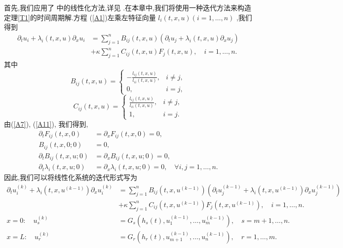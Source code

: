 \documentclass[notitlepage,cs4size,punct,oneside]{ctexrep}
\numberwithin{equation}{chapter}
\theoremstyle{mystyle}
\begin{document}
首先,我们应用了\cite{15} 中的线性化方法,详见\cite{12} .在本章中,我们将使用一种迭代方法来构造定理\ref{T1}的时间周期解.方程 (\ref{A1})左乘左特征向量 $l_{i}(t,x,u)(i=1, \ldots, n)$ ,我们得到
\begin{align}
    \partial_{t} u_{i}+\lambda_{i}(t,x,u) \partial_{x} u_{i} & = \sum_{j=1}^{n} B_{i j}(t,x,u)\left(\partial_{t} u_{j}+\lambda_{i}(t,x,u) \partial_{x} u_{j}\right)\nonumber \\
                                                             & +\kappa \sum_{j=1}^{n}C_{i j}(t,x,u) F_j(t,x,u), \quad i=1, \ldots, n .\label{B1}
\end{align}
其中
\begin{equation}\label{B2}
    B_{i j}(t,x,u)=\left\{\begin{array}{cc}
        -\frac{l_{i j}(t,x,u)}{l_{i i}(t,x,u)}, & i \neq j, \\
        0,                                      & i=j,
    \end{array}\right.
\end{equation}
\begin{equation}\label{B3}
    C_{i j}(t,x,u)=\left\{\begin{array}{cc}
        \frac{l_{i j}(t,x,u)}{l_{i i}(t,x,u)}, & i \neq j, \\
        1,                                     & i=j.
    \end{array}\right.
\end{equation}
由(\ref{A7}), (\ref{A11}), 我们得到,
\begin{align}
    \partial _{t} F_{i j}(t,x,0)       & =\partial _{x} F_{i j}(t,x,0)=0, \label{B4.2}                                       \\
    B_{i j}(t,x,0;0)                   & =0, \label{B4}                                                                      \\
    \partial _{t} B_{i j}(t,x,u;0)     & =\partial _{x} B_{i j}(t,x,u;0)=0, \label{B4.1}                                     \\
    \partial _{t} \lambda_{i}(t,x,u;0) & =\partial _{x} \lambda_{i}(t,x,u;0)=0, \quad \forall i, j=1, \ldots, n.\label{B4.3}
\end{align}
因此,我们可以将线性化系统的迭代形式写为
\begin{align}
    \label{B5}
    \partial_{t} u_{i}^{(k)}+\lambda_{i}(t,x,u^{(k-1)}) \partial_{x} u_{i}^{(k)}
                          & = \sum_{j=1}^{n} B_{i j}(t,x,u^{(k-1)})\left(\partial_{t} u_{j}^{(k-1)}+\lambda_{i}(t,x,u^{(k-1)}) \partial_{x} u_{j}^{(k-1)}\right)\nonumber \\
                          & + \kappa  \sum_{j=1}^{n}C_{i j}(t,x,u^{(k-1)}) F_j(t,x,u^{(k-1)}), \quad i=1, \ldots, n.                                                      \\
    x=0:\quad u_{s}^{(k)} & =G_{s}(h_{s}(t), u_{1}^{(k-1)}, \ldots, u_{m}^{(k-1)}), \quad s=m+1, \ldots, n.  \label{B6}                                                   \\
    x=L:\quad u_{r}^{(k)} & =G_{r}(h_{r}(t), u_{m+1}^{(k-1)}, \ldots, u_{n}^{(k-1)}), \quad r=1, \ldots, m. \label{B7}
\end{align}
\end{document}

